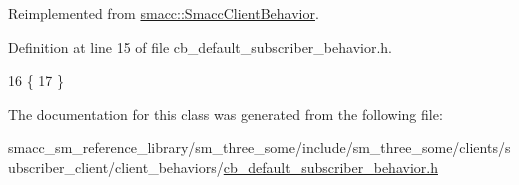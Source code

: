 Reimplemented from \hyperlink{classsmacc_1_1SmaccClientBehavior_a7962382f93987c720ad432fef55b123f}{smacc\+::\+Smacc\+Client\+Behavior}.



Definition at line 15 of file cb\+\_\+default\+\_\+subscriber\+\_\+behavior.\+h.


\begin{DoxyCode}
16     \{
17     \}
\end{DoxyCode}


The documentation for this class was generated from the following file\+:\begin{DoxyCompactItemize}
\item 
smacc\+\_\+sm\+\_\+reference\+\_\+library/sm\+\_\+three\+\_\+some/include/sm\+\_\+three\+\_\+some/clients/subscriber\+\_\+client/client\+\_\+behaviors/\hyperlink{cb__default__subscriber__behavior_8h}{cb\+\_\+default\+\_\+subscriber\+\_\+behavior.\+h}\end{DoxyCompactItemize}

